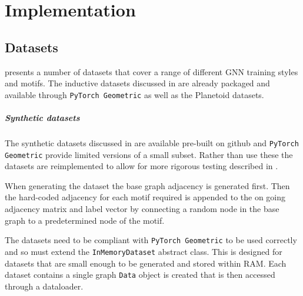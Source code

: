 \chapter{Implementation}

\section{Datasets}
\label{sec:datasets-imp}
 presents a number of datasets that cover a range of different GNN training styles and motifs.
The inductive datasets discussed in  are already packaged and available through \texttt{PyTorch Geometric}\cite{Fey/Lenssen/2019} as well as the Planetoid\cite{planetoid}\cite{citation} datasets.

\paragraph{Synthetic datasets}
The synthetic datasets discussed in  are available pre-built on github and \texttt{PyTorch Geometric}\cite{Fey/Lenssen/2019} provide limited versions of a small subset.
Rather than use these the datasets are reimplemented to allow for more rigorous testing described in .

When generating the dataset the base graph adjacency is generated first. 
Then the hard-coded adjacency for each motif required is 
appended to the on going adjacency matrix and label vector by connecting
a random node in the base graph to a predetermined node of the motif.

The datasets need to be compliant with \texttt{PyTorch Geometric} to be used correctly and so must extend the \texttt{InMemoryDataset} abstract class. 
This is designed for datasets that are small enough to be generated and stored within RAM.
Each dataset contains a single graph \texttt{Data} object is created that is then accessed through a dataloader.

